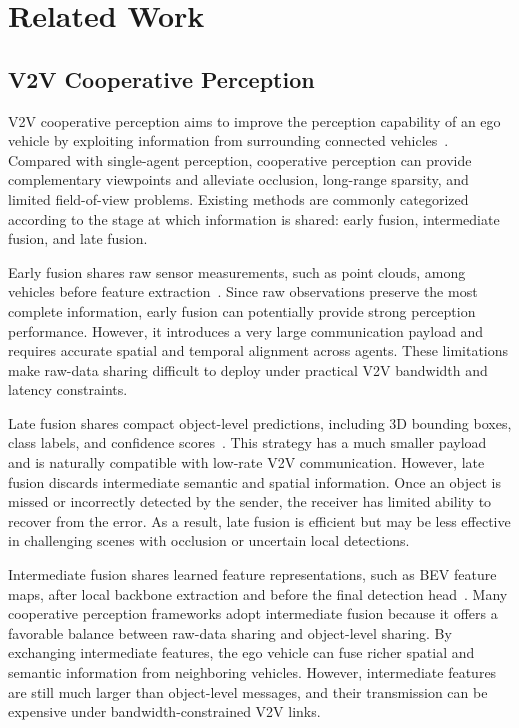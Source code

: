 \documentclass[journal]{IEEEtran}
\begin{document}
\section{Related Work}

\subsection{V2V Cooperative Perception}

V2V cooperative perception aims to improve the perception capability of an ego vehicle by exploiting information from surrounding connected vehicles~\cite{xu2022opv2v,han2023collaborative}. Compared with single-agent perception, cooperative perception can provide complementary viewpoints and alleviate occlusion, long-range sparsity, and limited field-of-view problems. Existing methods are commonly categorized according to the stage at which information is shared: early fusion, intermediate fusion, and late fusion.

Early fusion shares raw sensor measurements, such as point clouds, among vehicles before feature extraction~\cite{xu2022opv2v}. Since raw observations preserve the most complete information, early fusion can potentially provide strong perception performance. However, it introduces a very large communication payload and requires accurate spatial and temporal alignment across agents. These limitations make raw-data sharing difficult to deploy under practical V2V bandwidth and latency constraints.

Late fusion shares compact object-level predictions, including 3D bounding boxes, class labels, and confidence scores~\cite{xu2022opv2v}. This strategy has a much smaller payload and is naturally compatible with low-rate V2V communication. However, late fusion discards intermediate semantic and spatial information. Once an object is missed or incorrectly detected by the sender, the receiver has limited ability to recover from the error. As a result, late fusion is efficient but may be less effective in challenging scenes with occlusion or uncertain local detections.

Intermediate fusion shares learned feature representations, such as BEV feature maps, after local backbone extraction and before the final detection head~\cite{xu2022v2xvit,hu2022where2comm,wang2020v2vnet,li2021disconet,xu2022cobevt,liu2020when2com,lu2024heal,hu2024pragmatic}. Many cooperative perception frameworks adopt intermediate fusion because it offers a favorable balance between raw-data sharing and object-level sharing. By exchanging intermediate features, the ego vehicle can fuse richer spatial and semantic information from neighboring vehicles. However, intermediate features are still much larger than object-level messages, and their transmission can be expensive under bandwidth-constrained V2V links.
\end{document}
